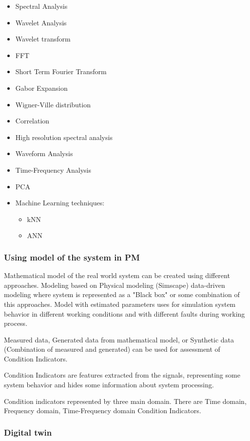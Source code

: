 \documentclass[class=article, crop=false]{standalone}
\begin{document}
\begin{itemize}
    \item Spectral Analysis
    \item Wavelet Analysis
    \item Wavelet transform
    \item FFT
    \item Short Term Fourier Transform
    \item Gabor Expansion
    \item Wigner-Ville distribution
    \item Correlation
    \item High resolution spectral analysis
    \item Waveform Analysis
    \item Time-Frequency Analysis
    \item PCA
    \item Machine Learning techniques:
        \begin{itemize}
            \item kNN
            \item ANN
        \end{itemize}
\end{itemize}

\subsubsection{Using model of the system in PM}

Mathematical model of the real world system can be created using different
approaches. Modeling based on Physical modeling (Simscape) data-driven
modeling where system is represented as a "Black box" or some combination
of this approaches.
Model with estimated parameters uses for simulation system behavior in
different working conditions and with different faults during working
process.

Measured data, Generated data from mathematical model, or Synthetic data
(Combination of measured and generated) can be used for assessment of
Condition Indicators. 

Condition Indicators are features extracted from the signals, representing some
system behavior and hides some information about system processing.

Condition indicators represented by three main domain. There are Time
domain, Frequency domain, Time-Frequency domain Condition Indicators.

\subsubsection{Digital twin}
\end{document}

